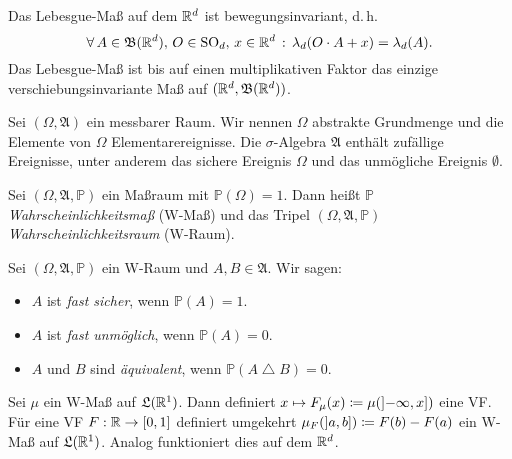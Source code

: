 \documentclass{cheat-sheet}
\newcommand{\Alg}{\mathfrak{A}} %
\newcommand{\LebAlg}{\mathfrak{L}} %
\renewcommand{\P}{\mathbb{P}} %
\newcommand{\Bor}{\mathfrak{B}} %
\DeclareMathOperator{\symmdiff}{\triangle}
\begin{document}
\begin{satz}
  Das Lebesgue-Maß auf dem $\mathbb{R}^d$ ist bewegungsinvariant, d.\,h.
  \[ \fa{A \in \Bor(\R^d), \, O \in \mathrm{SO}_d, \, x \in \R^d} \lambda_d(O \cdot A + x) = \lambda_d(A). \]
  Das Lebesgue-Maß ist bis auf einen multiplikativen Faktor das einzige verschiebungsinvariante Maß auf $(\R^d, \Bor(\R^d))$.
\end{satz}


\begin{sprech}
  Sei $(\Omega, \Alg)$ ein messbarer Raum. Wir nennen $\Omega$ abstrakte Grundmenge und die Elemente von $\Omega$ Elementarereignisse. Die $\sigma$-Algebra $\Alg$ enthält zufällige Ereignisse, unter anderem das sichere Ereignis $\Omega$ und das unmögliche Ereignis $\emptyset$.
\end{sprech}

\begin{defn}
  Sei $(\Omega, \Alg, \P)$ ein Maßraum mit $\P(\Omega) = 1$. Dann heißt $\P$ \emph{Wahrscheinlichkeitsmaß} (W-Maß) und das Tripel $(\Omega, \Alg, \P)$ \emph{Wahrscheinlichkeitsraum} (W-Raum).
\end{defn}

\begin{sprech}
  Sei $(\Omega, \Alg, \P)$ ein W-Raum und $A, B \in \Alg$. Wir sagen:
  \begin{itemize}
    \item $A$ ist \emph{fast sicher}, wenn $\P(A) = 1$.
    \item $A$ ist \emph{fast unmöglich}, wenn $\P(A) = 0$.
    \item $A$ und $B$ sind \emph{äquivalent}, wenn $\P(A \symmdiff B) = 0$.
  \end{itemize}
\end{sprech}



\begin{bem}
  Sei $\mu$ ein W-Maß auf $\LebAlg(\R^1)$. Dann definiert $x \mapsto F_{\mu}(x) \coloneqq \mu(\left] -\infty, x \right])$ eine VF. Für eine VF $F : \mathbb{R} \to \left[ 0, 1 \right]$ definiert umgekehrt $\mu_F(\left] a, b \right]) \coloneqq F(b) - F(a)$ ein W-Maß auf $\LebAlg(\R^1)$. Analog funktioniert dies auf dem $\mathbb{R}^d$.
\end{bem}

\end{document}
